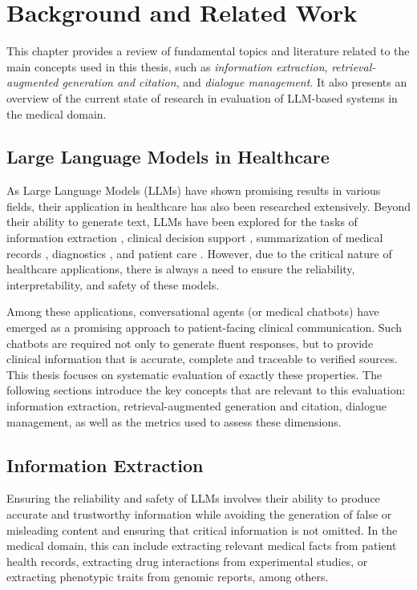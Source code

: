\chapter{Background and Related Work}

This chapter provides a review of fundamental topics and literature related to the main concepts used in this thesis, such as \textit{information extraction}, \textit{retrieval-augmented generation and citation}, and \textit{dialogue management}. It also presents an overview of the current state of research in evaluation of LLM-based systems in the medical domain.

\section{Large Language Models in Healthcare}

As Large Language Models (LLMs) have shown promising results in various fields, their application in healthcare has also been researched extensively. 
Beyond their ability to generate text, LLMs have been explored for the tasks of information extraction \cite{cremaAdvancingItalianBiomedical2023}, clinical decision support \cite{liLargeLanguageModelspowered2025}, summarization of medical records \cite{tangEvaluatingLargeLanguage2023}, diagnostics \cite{almubarkExploringImpactLarge2025}, and patient care \cite{javaidChatGPTHealthcareServices2023}.
However, due to the critical nature of healthcare applications, there is always a need to ensure the reliability, interpretability, and safety of these models.

Among these applications, conversational agents (or medical chatbots) have emerged as a promising approach to patient-facing clinical communication. 
Such chatbots are required not only to generate fluent responses, but to provide clinical information that is accurate, complete and traceable to verified sources. 
This thesis focuses on systematic evaluation of exactly these properties.
The following sections introduce the key concepts that are relevant to this evaluation: information extraction, retrieval-augmented generation and citation, dialogue management, as well as the metrics used to assess these dimensions.


\section{Information Extraction}

Ensuring the reliability and safety of LLMs involves their ability to produce accurate and trustworthy information while avoiding the generation of false or misleading content and ensuring that critical information is not omitted. In the medical domain, this can include extracting relevant medical facts from patient health records, extracting drug interactions from experimental studies, or extracting phenotypic traits from genomic reports, among others.

